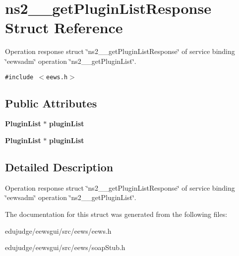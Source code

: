 \section{ns2\_\-\_\-getPluginListResponse Struct Reference}
\label{structns2____getPluginListResponse}
Operation response struct \char`\"{}ns2\_\-\_\-getPluginListResponse\char`\"{} of service binding \char`\"{}eewsadm\char`\"{} operation \char`\"{}ns2\_\-\_\-getPluginList\char`\"{}.  


{\tt \#include $<$eews.h$>$}

\subsection*{Public Attributes}
\begin{CompactItemize}
\item 
{\bf PluginList} $\ast$ \textbf{pluginList}\label{structns2____getPluginListResponse_0083b2c87a18f28cac913884556d29f3}

\item 
{\bf PluginList} $\ast$ \textbf{pluginList}\label{structns2____getPluginListResponse_0083b2c87a18f28cac913884556d29f3}

\end{CompactItemize}


\subsection{Detailed Description}
Operation response struct \char`\"{}ns2\_\-\_\-getPluginListResponse\char`\"{} of service binding \char`\"{}eewsadm\char`\"{} operation \char`\"{}ns2\_\-\_\-getPluginList\char`\"{}. 

The documentation for this struct was generated from the following files:\begin{CompactItemize}
\item 
edujudge/eewsgui/src/eews/eews.h\item 
edujudge/eewsgui/src/eews/soapStub.h\end{CompactItemize}
